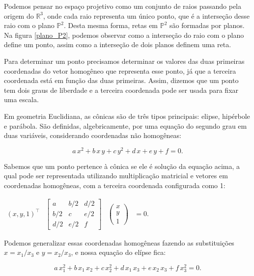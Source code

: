 Podemos pensar no espaço projetivo como um conjunto de raios passando pela origem do $\mathbb{R}^3$, onde cada raio representa um único ponto, que é a interseção desse raio com o plano $\mathbb{P}^2$. Desta mesma forma, retas em $\mathbb{P}^2$ são formadas por planos. Na figura \ref{plano_P2}, podemos observar como a interseção do raio com o plano define um ponto, assim como a interseção de dois planos definem uma reta.


Para determinar um ponto precisamos determinar os valores das duas primeiras coordenadas do vetor homogêneo que representa esse ponto, já que a terceira coordenada está em função das duas primeiras. Assim, dizemos que um ponto tem dois graus de liberdade e a terceira coordenada pode ser usada para fixar uma escala.
\\



Em geometria Euclidiana, as cônicas são de três tipos principais: elipse, hipérbole e parábola. São definidas, algebricamente, por uma equação do segundo grau em duas variáveis, considerando coordenadas não homogêneas:

\begin{equation*}
a\,x^2+b\,x\,y+c\,y^2+d\,x+e\,y+f=0.
\end{equation*}

Sabemos que um ponto pertence à cônica se ele é solução da equação acima, a qual pode ser representada utilizando multiplicação matricial e vetores em coordenadas homogêneas, com a terceira coordenada configurada como 1:

\begin{center}
$
\begin{array}{cccc}
  (x,y,1)^\top 
& \begin{bmatrix}
a & b/2 & d/2\\
b/2 & c & e/2\\
d/2 & e/2 & f
\end{bmatrix}
& \begin{pmatrix}
x\\
y\\
1
\end{pmatrix}
& = 0.
\end{array}
$
\end{center}

Podemos generalizar essas coordenadas homogêneas fazendo as substituições $x = x_{1}/x_{3}$ e $y = x_{2}/x_{3}$, e nossa equação do elípse fica:

\begin{equation*}
a\,x_1^2+b\,x_1\,x_2+c\,x_2^2+d\,x_1\,x_3+e\,x_2\,x_3+f\,x_3^2=0.
\end{equation*}

